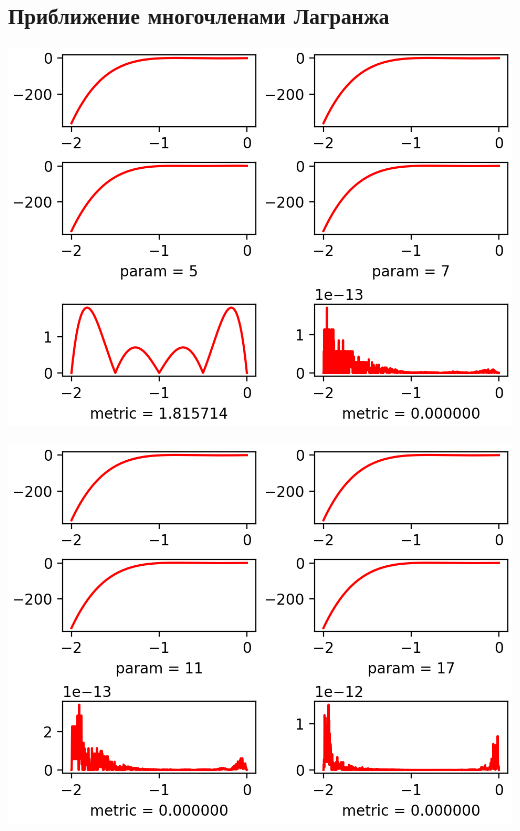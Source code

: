 \documentclass{article}
\begin{document}
\subsection{Приближение многочленами Лагранжа}
\begin{Center}
\includegraphics{F1_p5p7_Lagrange.png}
\hfill

\includegraphics{F1_p11p17_Lagrange.png}
\hfill


\end{Center}
\end{document}
